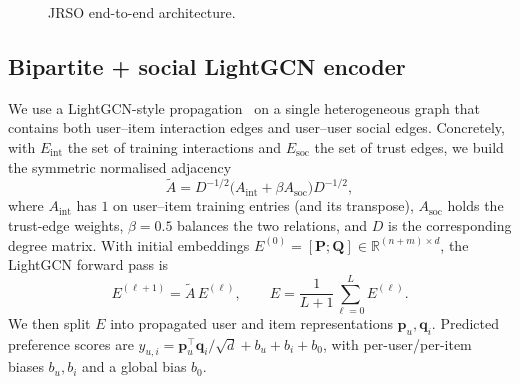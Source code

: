 \documentclass[conference]{IEEEtran}
\begin{document}
\begin{figure}[t]
\centering
\caption{JRSO end-to-end architecture.}
\label{fig:arch}
\end{figure}

\subsection{Bipartite + social LightGCN encoder}
We use a LightGCN-style propagation~\cite{he2020lightgcn} on a single
heterogeneous graph that contains both user--item interaction edges and
user--user social edges. Concretely, with $E_{\text{int}}$ the set of
training interactions and $E_{\text{soc}}$ the set of trust edges, we
build the symmetric normalised adjacency
\begin{equation}
\widetilde{A}=D^{-1/2}\bigl(A_{\text{int}}+\beta A_{\text{soc}}\bigr)D^{-1/2},
\label{eq:lightgcn-adj}
\end{equation}
where $A_{\text{int}}$ has $1$ on user--item training entries (and its
transpose), $A_{\text{soc}}$ holds the trust-edge weights, $\beta\!=\!0.5$
balances the two relations, and $D$ is the corresponding degree matrix.
With initial embeddings
$E^{(0)}=[\mathbf{P};\mathbf{Q}]\in\mathbb{R}^{(n+m)\times d}$, the
LightGCN forward pass is
\[
E^{(\ell+1)}=\widetilde{A}\,E^{(\ell)},\qquad
E=\frac{1}{L+1}\sum_{\ell=0}^{L}E^{(\ell)}.
\]
We then split $E$ into propagated user and item representations
$\mathbf{p}_u,\mathbf{q}_i$. Predicted preference scores are
$\hat{y}_{u,i}=\mathbf{p}_u^\top\mathbf{q}_i/\sqrt{d}+b_u+b_i+b_0$,
with per-user/per-item biases $b_u,b_i$ and a global bias $b_0$.
\end{document}
